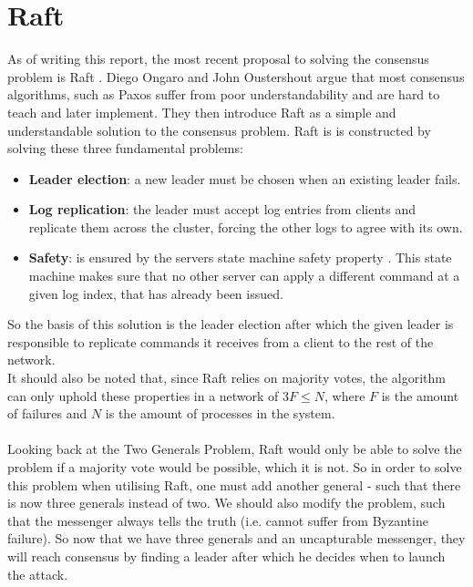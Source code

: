 \section{Raft}
As of writing this report, the most recent proposal to solving the consensus problem is Raft \cite{Raft}. Diego Ongaro and John Oustershout argue that most consensus algorithms, such as Paxos \cite{Paxos} suffer from poor understandability and are hard to teach and later implement. They then introduce Raft as a simple and understandable solution to the consensus problem. Raft is is constructed by solving these three fundamental problems:
\begin{itemize}
\item \textbf{Leader election}: a new leader must be chosen when an existing leader fails.
\item \textbf{Log replication}: the leader must accept log entries from clients and replicate them across the cluster, forcing the other logs to agree with its own.\cite{Raft}
\item \textbf{Safety}: is ensured by the servers state machine safety property \cite{Raft}. This state machine makes sure that no other server can apply a different command at a given log index, that has already been issued. 

\end{itemize}
So the basis of this solution is the leader election after which the given leader is responsible to replicate commands it receives from a client to the rest of the network. \\
It should also be noted that, since Raft relies on majority votes, the algorithm can only uphold these properties in a network of $3F \leq N$, where $F$ is the amount of failures and $N$ is the amount of processes in the system.
\\ \\
Looking back at the Two Generals Problem, Raft would only be able to solve the problem if a majority vote would be possible, which it is not. So in order to solve this problem when utilising Raft, one must add another general - such that there is now three generals instead of two. We should also modify the problem, such that the messenger always tells the truth (i.e. cannot suffer from Byzantine failure). So now that we have three generals and an uncapturable messenger, they will reach consensus by finding a leader after which he decides when to launch the attack.